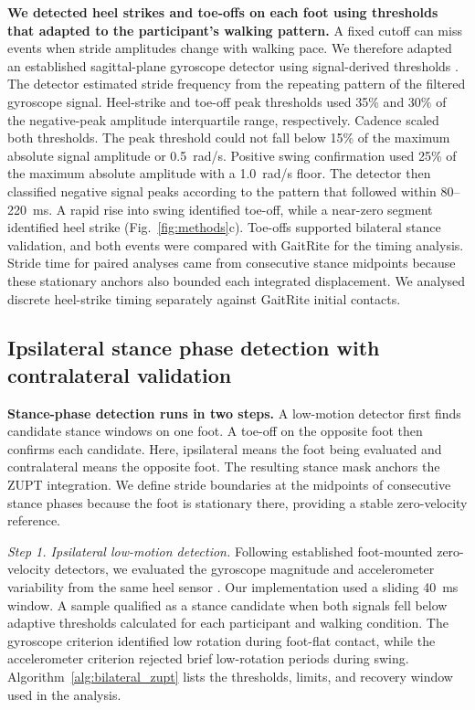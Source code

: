 \documentclass[fleqn,10pt,lineno]{wlpeerj}
\begin{document}
\textbf{We detected heel strikes and toe-offs on each foot using thresholds that adapted to the participant's walking pattern.} A fixed cutoff can miss events when stride amplitudes change with walking pace. We therefore adapted an established sagittal-plane gyroscope detector \citep{Salarian2004} using signal-derived thresholds \citep{Greene2010}. The detector estimated stride frequency from the repeating pattern of the filtered gyroscope signal. Heel-strike and toe-off peak thresholds used 35\% and 30\% of the negative-peak amplitude interquartile range, respectively. Cadence scaled both thresholds. The peak threshold could not fall below 15\% of the maximum absolute signal amplitude or 0.5~rad/s. Positive swing confirmation used 25\% of the maximum absolute amplitude with a 1.0~rad/s floor. The detector then classified negative signal peaks according to the pattern that followed within 80--220~ms. A rapid rise into swing identified toe-off, while a near-zero segment identified heel strike (Fig.~\ref{fig:methods}c). Toe-offs supported bilateral stance validation, and both events were compared with GaitRite for the timing analysis. Stride time for paired analyses came from consecutive stance midpoints because these stationary anchors also bounded each integrated displacement. We analysed discrete heel-strike timing separately against GaitRite initial contacts.

\subsection{Ipsilateral stance phase detection with contralateral validation}\label{sec:stance}

\textbf{Stance-phase detection runs in two steps.} A low-motion detector first finds candidate stance windows on one foot. A toe-off on the opposite foot then confirms each candidate. Here, ipsilateral means the foot being evaluated and contralateral means the opposite foot. The resulting stance mask anchors the ZUPT integration. We define stride boundaries at the midpoints of consecutive stance phases because the foot is stationary there, providing a stable zero-velocity reference.

\textit{Step 1. Ipsilateral low-motion detection.} Following established foot-mounted zero-velocity detectors, we evaluated the gyroscope magnitude and accelerometer variability from the same heel sensor \citep{Skog2010, Foxlin2005}. Our implementation used a sliding 40~ms window. A sample qualified as a stance candidate when both signals fell below adaptive thresholds calculated for each participant and walking condition. The gyroscope criterion identified low rotation during foot-flat contact, while the accelerometer criterion rejected brief low-rotation periods during swing. Algorithm~\ref{alg:bilateral_zupt} lists the thresholds, limits, and recovery window used in the analysis.
\end{document}
